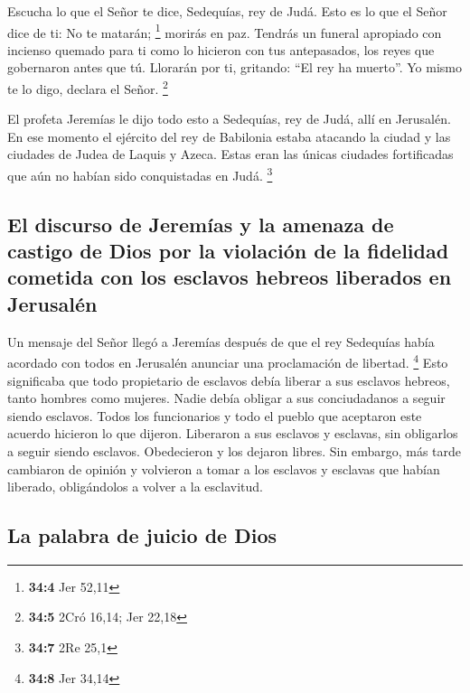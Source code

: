  Escucha lo que el Señor te dice, Sedequías, rey de Judá.
Esto es lo que el Señor dice de ti: No te matarán; \footnote{\textbf{34:4}
  Jer 52,11}  morirás en paz. Tendrás un funeral apropiado
con incienso quemado para ti como lo hicieron con tus antepasados, los
reyes que gobernaron antes que tú. Llorarán por ti, gritando: ``El rey
ha muerto''. Yo mismo te lo digo, declara el Señor. \footnote{\textbf{34:5}
  2Cró 16,14; Jer 22,18}

 El profeta Jeremías le dijo todo esto a Sedequías, rey de
Judá, allí en Jerusalén.  En ese momento el ejército del
rey de Babilonia estaba atacando la ciudad y las ciudades de Judea de
Laquis y Azeca. Estas eran las únicas ciudades fortificadas que aún no
habían sido conquistadas en Judá. \footnote{\textbf{34:7} 2Re 25,1}

\hypertarget{el-discurso-de-jeremuxedas-y-la-amenaza-de-castigo-de-dios-por-la-violaciuxf3n-de-la-fidelidad-cometida-con-los-esclavos-hebreos-liberados-en-jerusaluxe9n}{%
\subsection{El discurso de Jeremías y la amenaza de castigo de Dios por
la violación de la fidelidad cometida con los esclavos hebreos liberados
en
Jerusalén}\label{el-discurso-de-jeremuxedas-y-la-amenaza-de-castigo-de-dios-por-la-violaciuxf3n-de-la-fidelidad-cometida-con-los-esclavos-hebreos-liberados-en-jerusaluxe9n}}

 Un mensaje del Señor llegó a Jeremías después de que el
rey Sedequías había acordado con todos en Jerusalén anunciar una
proclamación de libertad. \footnote{\textbf{34:8} Jer 34,14}
 Esto significaba que todo propietario de esclavos debía
liberar a sus esclavos hebreos, tanto hombres como mujeres. Nadie debía
obligar a sus conciudadanos a seguir siendo esclavos. 
Todos los funcionarios y todo el pueblo que aceptaron este acuerdo
hicieron lo que dijeron. Liberaron a sus esclavos y esclavas, sin
obligarlos a seguir siendo esclavos. Obedecieron y los dejaron libres.
 Sin embargo, más tarde cambiaron de opinión y volvieron
a tomar a los esclavos y esclavas que habían liberado, obligándolos a
volver a la esclavitud.

\hypertarget{la-palabra-de-juicio-de-dios}{%
\subsection{La palabra de juicio de
Dios}\label{la-palabra-de-juicio-de-dios}}

